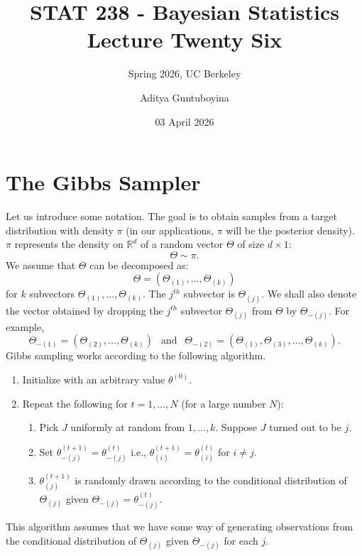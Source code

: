 \documentclass{scrartcl}
\newcommand{\R}{{\mathbb R}}
\begin{document}
\title{STAT 238 - Bayesian Statistics  \\
  Lecture Twenty Six} 
\subtitle{Spring 2026, UC Berkeley}

\author{Aditya Guntuboyina}


\date{03 April 2026}

\maketitle

\section{The Gibbs Sampler}
Let us introduce some notation. The goal is to obtain
samples from a target distribution with density $\pi$ (in our
applications, $\pi$ will be the posterior density). $\pi$ represents
the density on $\R^d$ of a random vector $\Theta$ of size $d \times
1$:  
\begin{equation*}
   \Theta \sim \pi. 
 \end{equation*}
 We assume that $\Theta$ can be decomposed as:
 \begin{equation*}
   \Theta = (\Theta_{(1)}, \dots, \Theta_{(k)}) 
 \end{equation*}
 for $k$ subvectors $\Theta_{(1)}, \dots, \Theta_{(k)}$. The $j^{th}$
 subvector is $\Theta_{(j)}$. We shall also denote the vector obtained
 by dropping the $j^{th}$ subvector $\Theta_{(j)}$ from $\Theta$ by
 $\Theta_{-(j)}$. For example, 
 \begin{equation*}
   \Theta_{-(1)} = (\Theta_{(2)}, \dots, \Theta_{(k)}) ~~ \text{  and
   } ~~ \Theta_{-(2)} = (\Theta_{(1)}, \Theta_{(3)}, \dots,
   \Theta_{(k)}). 
 \end{equation*}
 Gibbs sampling works according to the following algorithm.
 \begin{enumerate}
 \item Initialize with an arbitrary value $\theta^{(0)}$.
 \item Repeat the following for $t = 1, \dots, N$ (for a large number
   $N$):
   \begin{enumerate}
   \item Pick $J$ uniformly at random from $1, \dots, k$. Suppose $J$
     turned out to be $j$. 
   \item  Set $\theta^{(t+1)}_{-(j)} = \theta^{(t)}_{-(j)}$ i.e.,
     $\theta^{(t+1)}_{(i)} = \theta^{(t)}_{(i)}$ for $i \neq j$.
    \item $\theta^{(t+1)}_{(j)}$ is randomly drawn according to the
      conditional distribution of $\Theta_{(j)}$  given $\Theta_{-(j)}
      = \theta^{(t)}_{-(j)}$. 
   \end{enumerate}
 \end{enumerate}
This algorithm assumes that we have some way of generating
observations from the conditional distribution of $\Theta_{(j)}$ given
$\Theta_{-(j)}$ for each $j$.
\end{document}
